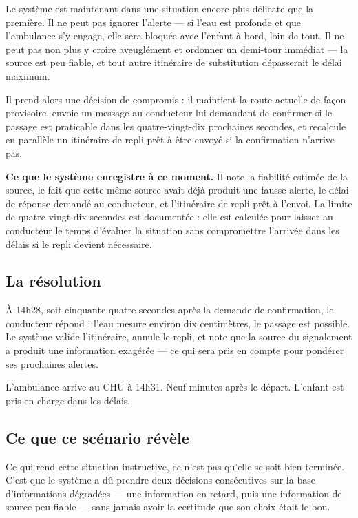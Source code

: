 \documentclass[12pt, a4paper]{article}
\begin{document}
Le système est maintenant dans une situation encore plus délicate que la
première. Il ne peut pas ignorer l'alerte — si l'eau est profonde et que
l'ambulance s'y engage, elle sera bloquée avec l'enfant à bord, loin de
tout. Il ne peut pas non plus y croire aveuglément et ordonner un demi-tour
immédiat — la source est peu fiable, et tout autre itinéraire de substitution
dépasserait le délai maximum.

Il prend alors une décision de compromis : il maintient la route actuelle
de façon provisoire, envoie un message au conducteur lui demandant de
confirmer si le passage est praticable dans les quatre-vingt-dix prochaines
secondes, et recalcule en parallèle un itinéraire de repli prêt à être
envoyé si la confirmation n'arrive pas.

\begin{exemple}
\textbf{Ce que le système enregistre à ce moment.}
Il note la fiabilité estimée de la source, le fait que cette même source
avait déjà produit une fausse alerte, le délai de réponse demandé au
conducteur, et l'itinéraire de repli prêt à l'envoi. La limite de
quatre-vingt-dix secondes est documentée : elle est calculée pour laisser
au conducteur le temps d'évaluer la situation sans compromettre l'arrivée
dans les délais si le repli devient nécessaire.
\end{exemple}

\subsection{La résolution}

À 14h28, soit cinquante-quatre secondes après la demande de confirmation,
le conducteur répond : l'eau mesure environ dix centimètres, le passage
est possible. Le système valide l'itinéraire, annule le repli, et note
que la source du signalement a produit une information exagérée — ce qui
sera pris en compte pour pondérer ses prochaines alertes.

L'ambulance arrive au CHU à 14h31. Neuf minutes après le départ.
L'enfant est pris en charge dans les délais.

\subsection{Ce que ce scénario révèle}

Ce qui rend cette situation instructive, ce n'est pas qu'elle se soit
bien terminée. C'est que le système a dû prendre deux décisions
consécutives sur la base d'informations dégradées — une information en
retard, puis une information de source peu fiable — sans jamais avoir
la certitude que son choix était le bon.
\end{document}
